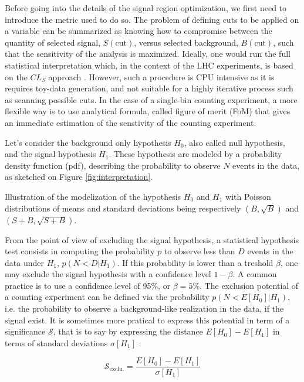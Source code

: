     Before going into the details of the signal region optimization, we first need to 
    introduce the metric used to do so. The problem of defining cuts to be applied on a 
    variable can be summarized as knowing how to compromise between the quantity of 
    selected signal, $S(\text{cut})$, versus selected background, $B(\text{cut})$, such 
    that the sensitivity of the analysis is maximized. Ideally, one would run the full 
    statistical interpretation which, in the context of the LHC experiments, is based
    on the $CL_S$ approach . However, such a procedure is CPU intensive as it is 
    requires toy-data generation, and not suitable for a highly iterative process such 
    as scanning possible cuts. In the case of a single-bin counting experiment, a more 
    flexible way is to use analytical formula, called figure of merit (FoM) that gives an
    immediate estimation of the senstivity of the counting experiment.

    Let's consider the background only hypothesis $H_0$, also called null hypothesis, 
    and the signal hypothesis $H_1$. These hypothesis are modeled by a probability density
    function (pdf), describing the probability to observe $N$ events in the data, as 
    sketched on Figure \ref{fig:interpretation}.
           
                 {Illustration of the modelization of the hypothesis $H_0$ and $H_1$ with
                 Poisson distributions of means and standard deviations being respectively 
                 $(B,\sqrt{B})$ and $(S+B,\sqrt{S+B})$. }

    From the point of view of excluding the signal hypothesis, a statistical hypothesis
    test consists in computing the probability $p$ to observe less than $D$ events in the 
    data under $H_1$, $p(N < D|H_1)$. If this probability is lower than a treshold 
    $\beta$, one may exclude the signal hypothesis with a confidence level $1-\beta$. A 
    common practice is to use a confidence level of 95\%, or $\beta = 5\%$. The exclusion 
    potential of a counting experiment can be defined via the probability $p(N < E[H_0]|H_1)$, 
    i.e. the probability to observe a background-like realization in the data, if the 
    signal exist. It is sometimes more pratical to express this potential in term of a 
    significance $\mathcal{S}$, that is to say by expressing the distance $E[H_0] - 
    E[H_1]$ in terms of standard deviations $\sigma[H_1]$ :
    
    $$ \mathcal{S}_\text{exclu.} = \frac{E[H_0] - E[H_1]}{\sigma[H_1]}$$

